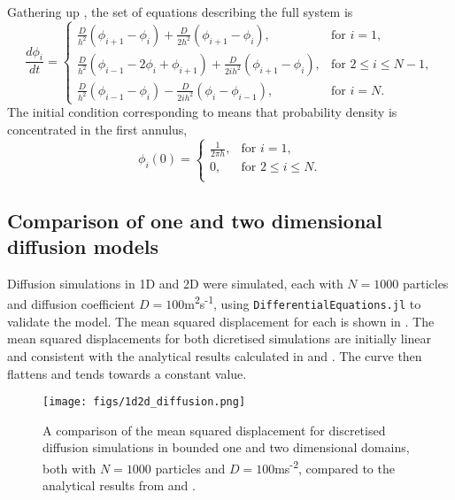 Gathering up , the set of equations describing the full system is
%
  \begin{equation}
  \frac{d\phi_i}{dt} = \begin{cases}
  		\frac{D}{h^2}(\phi_{i+1} - \phi_{i}) + \frac{D}{2h^2} (\phi_{i+1}-\phi_i), & \text{for } i = 1, \\
  		\frac{D}{h^2}(\phi_{i-1}-2\phi_i +\phi_{i+1}) + \frac{D}{2ih^2} (\phi_{i+1}-\phi_{i}), & \text{for } 2 \leq i \leq N-1, \\
  		\frac{D}{h^2}(\phi_{i-1}-\phi_i) - \frac{D}{2ih^2} (\phi_{i}-\phi_{i-1}), & \text{for } i = N .
  		\end{cases}
          \label{eqn:discrete_diffusion2d}
  \end{equation}
 The initial condition corresponding to  means that probability density is concentrated in the first annulus,
%
\begin{equation}
\phi_i(0) = \begin{cases}
       \frac{1}{2\pi h}, & \text{for } i = 1, \\
       0, & \text{for } 2 \leq i \leq N. \\
       \end{cases}
        \label{eqn:discrete_diffusion_IC}
\end{equation}
%


%
\subsection{Comparison of one and two dimensional diffusion models}
%
Diffusion simulations in 1D and 2D were simulated, each with $N=1000$ particles and diffusion coefficient $D=100$m\textsuperscript{2}s\textsuperscript{-1}, using \texttt{DifferentialEquations.jl} \cite{DifferentialEquations} to validate the model. The mean squared displacement for each is shown in . The mean squared displacements for both dicretised simulations are initially linear and consistent with the analytical results calculated in  and . The curve then flattens and tends towards a constant value.
%

\begin{figure}
\centering
    \texttt{[image: figs/1d2d\_diffusion.png]}
    \caption{A comparison of the mean squared displacement for discretised diffusion simulations in bounded one and two dimensional domains, both with $N=1000$ particles and $D=100$ms\textsuperscript{-2}, compared to the analytical results from  and .}
\label{fig:1d2d_diffusion}
\end{figure}
%
